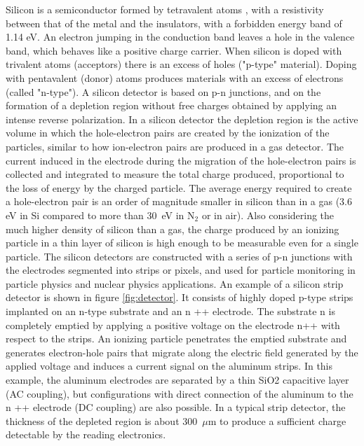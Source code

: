 \noindent Silicon is a semiconductor formed by tetravalent atoms \cite{detector}, with a resistivity between that of the metal and the insulators, with a forbidden energy band of 1.14 eV.
An electron jumping in the conduction band leaves a hole in the valence band, which behaves like a positive charge carrier.
When silicon is doped with trivalent atoms (acceptors) there is an excess of holes ("p-type" material).
Doping with pentavalent (donor) atoms produces materials with an excess of electrons (called "n-type").
\newline
A silicon detector is based on p-n junctions, and on the formation of a depletion region without free charges obtained by applying an intense reverse polarization.
In a silicon detector the depletion region is the active volume in which the hole-electron pairs are created by the ionization of the particles, similar to how ion-electron pairs are produced in a gas detector.
The current induced in the electrode during the migration of the hole-electron pairs is collected and integrated to measure the total charge produced, proportional to the loss of energy by the charged particle.
\newline
The average energy required to create a hole-electron pair is an order of magnitude smaller in silicon than in a gas (3.6 eV in Si compared to more than 30~eV in N$_2$ or in air).
Also considering the much higher density of silicon than a gas, the charge produced by an ionizing particle in a thin layer of silicon is high enough to be measurable even for a single particle.
\newline
The silicon detectors are constructed with a series of p-n junctions with the electrodes segmented into strips or pixels, and used for particle monitoring in particle physics and nuclear physics applications.
An example of a silicon strip detector is shown in figure \ref{fig:detector}. It consists of highly doped p-type strips implanted on an n-type substrate and an n ++ electrode.
The substrate n is completely emptied by applying a positive voltage on the electrode n++ with respect to the strips.
An ionizing particle penetrates the emptied substrate and generates electron-hole pairs that migrate along the electric field generated by the applied voltage and induces a current signal on the aluminum strips.
In this example, the aluminum electrodes are separated by a thin SiO2 capacitive layer (AC coupling), but configurations with direct connection of the aluminum to the n ++ electrode (DC coupling) are also possible.
In a typical strip detector, the thickness of the depleted region is about 300~$\mu$m to produce a sufficient charge detectable by the reading electronics. 
